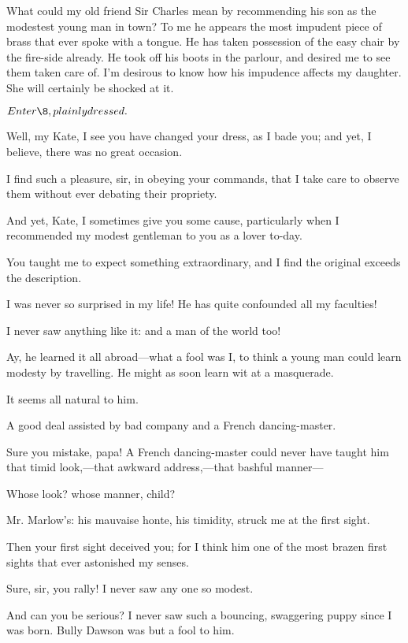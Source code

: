 \documentclass{book}
\begin{document}
\3  What could my old friend Sir Charles mean by recommending
his son as the modestest young man in town?  To me he appears the most
impudent piece of brass that ever spoke with a tongue.  He has taken
possession of the easy chair by the fire-side already.  He took off his
boots in the parlour, and desired me to see them taken care of.  I'm
desirous to know how his impudence affects my daughter.  She will
certainly be shocked at it.


\(Enter \8, plainly dressed.\)


\3  Well, my Kate, I see you have changed your dress, as I
bade you; and yet, I believe, there was no great occasion.

\8  I find such a pleasure, sir, in obeying your
commands, that I take care to observe them without ever debating their
propriety.

\3  And yet, Kate, I sometimes give you some cause,
particularly when I recommended my modest gentleman to you as a lover
to-day.

\8  You taught me to expect something extraordinary, and
I find the original exceeds the description.

\3  I was never so surprised in my life!  He has quite
confounded all my faculties!

\8  I never saw anything like it: and a man of the world
too!

\3  Ay, he learned it all abroad---what a fool was I, to think
a young man could learn modesty by travelling.  He might as soon learn
wit at a masquerade.

\8  It seems all natural to him.

\3  A good deal assisted by bad company and a French danc\-ing-master.

{\nonfrenchspacing
\8  Sure you mistake, papa!  A French dancing-master
could never have taught him that timid look,---that awkward
address,---that bashful manner---

}

\3  Whose look?  whose manner, child?

\8  Mr. Marlow's: his mauvaise honte, his timidity,
struck me at the first sight.

\3  Then your first sight deceived you; for I think him one of
the most brazen first sights that ever astonished my senses.

\8  Sure, sir, you rally!  I never saw any one so
modest.

\3  And can you be serious?  I never saw such a bouncing,
swaggering puppy since I was born.  Bully Dawson was but a fool to him.
\end{document}
